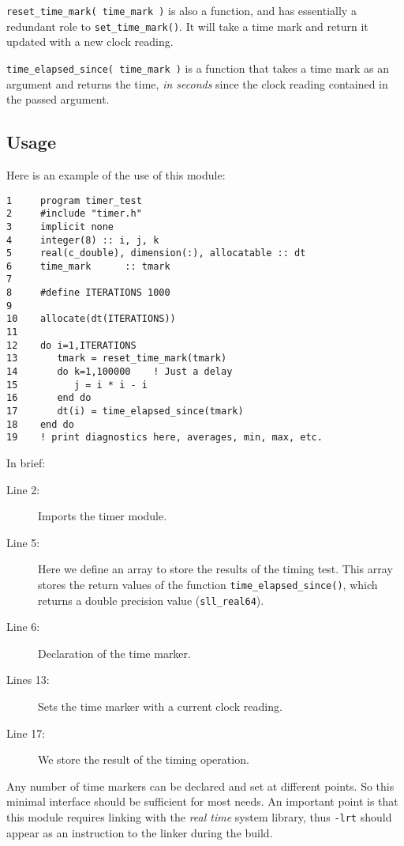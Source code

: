 \documentclass[]{report}   %
\begin{document}
\verb+reset_time_mark( time_mark )+ is also a function, and has essentially a redundant role to \verb+set_time_mark()+. It will take a time mark and return it updated with a new clock reading.

\verb+time_elapsed_since( time_mark )+ is a function that takes a time mark as an argument and returns the time, \emph{in seconds} since the clock reading contained in the passed argument.

\subsection{Usage}
Here is an example of the use of this module:

\begin{verbatim}
1     program timer_test
2     #include "timer.h"
3     implicit none
4     integer(8) :: i, j, k
5     real(c_double), dimension(:), allocatable :: dt
6     time_mark      :: tmark
7
8     #define ITERATIONS 1000
9 
10    allocate(dt(ITERATIONS))
11
12    do i=1,ITERATIONS
13       tmark = reset_time_mark(tmark)
14       do k=1,100000    ! Just a delay
15          j = i * i - i
16       end do
17       dt(i) = time_elapsed_since(tmark) 
18    end do
19    ! print diagnostics here, averages, min, max, etc.
\end{verbatim}

In brief:
\begin{description}
\item[Line 2:]
Imports the timer module. 

\item[Line 5:]
Here we define an array to store the results of the timing test. This array stores the return values of the function \verb+time_elapsed_since()+, which returns a double precision value (\verb+sll_real64+).

\item[Line 6: ]
Declaration of the time marker.

\item[Lines 13:]
Sets the time marker with a current clock reading.

\item[Line 17:]
We store the result of the timing operation.
\end{description}

Any number of time markers can be declared and set at different points. So this minimal interface should be sufficient for most needs. An important point is that this module requires linking with the \emph{real time} system library, thus \verb+-lrt+ should appear as an instruction to the linker during the build.
\end{document}
